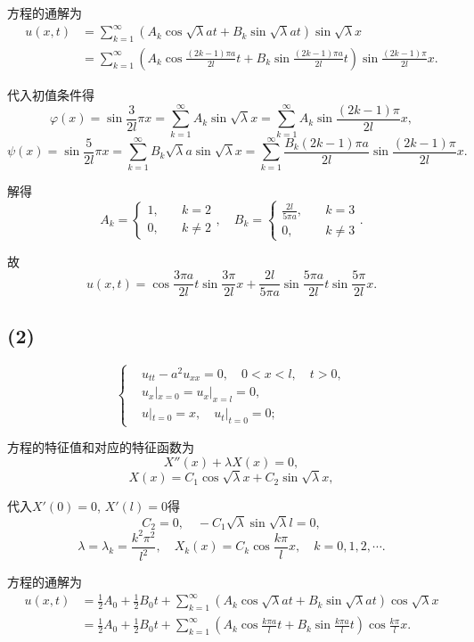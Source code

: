 \documentclass[11pt,a4paper]{article}
\begin{document}
方程的通解为
\begin{align*}
  u(x,t)
   & =\sum_{k=1}^\infty\left(A_k\cos\sqrt{\lambda}at+
  B_k\sin\sqrt{\lambda}at\right)\sin\sqrt{\lambda}x          \\
   & =\sum_{k=1}^\infty\left(A_k\cos\frac{(2k-1)\pi a}{2l}t+
  B_k\sin\frac{(2k-1)\pi a}{2l}t\right)\sin\frac{(2k-1)\pi}{2l}x.
\end{align*}

代入初值条件得
$$\varphi(x)=\sin\frac{3}{2l}\pi x=\sum_{k=1}^\infty A_k\sin\sqrt{\lambda}x=\sum_{k=1}^\infty A_k\sin\frac{(2k-1)\pi }{2l}x,$$
$$\psi(x)=\sin\frac{5}{2l}\pi x=\sum_{k=1}^\infty B_k\sqrt{\lambda}a\sin\sqrt{\lambda}x=\sum_{k=1}^\infty \frac{B_k(2k-1)\pi a}{2l}\sin\frac{(2k-1)\pi}{2l}x.$$

解得
$$A_k=\left\{\begin{aligned}1, &\quad k = 2 \\ 0, &\quad k\neq 2 \end{aligned}\right.,\quad B_k=\left\{\begin{aligned}\frac{2l}{5\pi a}, &\quad k = 3 \\ 0, &\quad k\neq 3 \end{aligned}\right..$$

故
$$u(x,t)=\cos\frac{3\pi a}{2l}t\sin\frac{3\pi}{2l}x+
  \frac{2l}{5\pi a}\sin\frac{5\pi a}{2l}t\sin\frac{5\pi}{2l}x.$$

\subsection*{(2)}

$$
  \left\{\begin{aligned}
     & u_{tt}-a^2u_{xx}=0, \quad 0<x<l,\quad t>0, \\
     & u_x|_{x=0}=u_x|_{x=l}=0,                   \\
     & u|_{t=0}=x,\quad u_t|_{t=0}=0;
  \end{aligned}\right.
$$

方程的特征值和对应的特征函数为
$$X''(x)+\lambda X(x)=0,$$
$$X(x)=C_1\cos\sqrt{\lambda}x+C_2\sin\sqrt{\lambda}x,$$

代入$X'(0)=0$, $X'(l)=0$得
$$C_2=0,\quad -C_1\sqrt{\lambda}\sin\sqrt{\lambda}l=0,$$
$$\lambda=\lambda_k=\frac{k^2\pi^2}{l^2},\quad X_k(x)=C_k\cos\frac{k\pi}{l}x,\quad k=0,1,2,\cdots.$$

方程的通解为
\begin{align*}
  u(x,t)
   & =\frac{1}{2}A_0+\frac{1}{2}B_0t+
  \sum_{k=1}^\infty\left(A_k\cos\sqrt{\lambda}at+
  B_k\sin\sqrt{\lambda}at\right)\cos\sqrt{\lambda}x \\
   & =\frac{1}{2}A_0+\frac{1}{2}B_0t+
  \sum_{k=1}^\infty\left(A_k\cos\frac{k\pi a}{l}t+
  B_k\sin\frac{k\pi a}{l}t\right)\cos\frac{k\pi}{l}x.
\end{align*}
\end{document}
